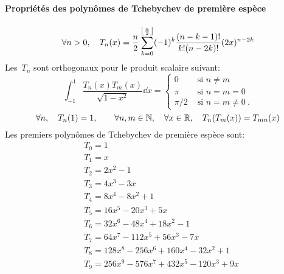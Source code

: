 \paragraph{Propriétés des polynômes de Tchebychev de première espèce} 
\begin{equation}
\forall n>0, \quad T_n(x)=\dfrac n2\displaystyle\sum_{k=0}^{\left\lfloor \frac n2\right\rfloor}(-1)^k \frac{(n-k-1)!}{k!(n-2k)!}(2x)^{n-2k} 
\end{equation}
Les~$T_n$ sont orthogonaux pour le produit scalaire suivant: 
\begin{equation}
 \int_{-1}^1 \frac{T_n(x)T_m(x)}{\sqrt{1-x^2}}\dd x= 
\begin{cases} 0&\text{ si } n\ne m\\ \pi&\text{ si } n=m=0\\ \pi/2&\text{ si } n=m\ne 0~. 
\end{cases} 
\end{equation}
\begin{equation}
\forall n, \quad T_n(1)=1,\qquad\forall n,m\in\mathbb N,\quad \forall x\in\mathbb R, \quad T_n(T_m(x))=T_{mn}(x) 
\end{equation}
Les premiers polynômes de Tchebychev de première espèce sont:
\begin{equation}
\begin{aligned}
&T_0 = 1 \\
&T_1 = x \\
&T_2 = 2x^2 - 1 \\
&T_3 = 4x^3 - 3x \\
& T_4 = 8x^4 - 8x^2 + 1 \\
& T_5 = 16x^5 - 20x^3 + 5x \\
& T_6 = 32x^6 - 48x^4 + 18x^2 - 1 \\
& T_7 = 64x^7 - 112x^5 + 56x^3 - 7x \\
& T_8 = 128x^8 - 256x^6 + 160x^4 - 32x^2 + 1 \\
&T_9 = 256x^9 - 576x^7 + 432x^5 - 120x^3 + 9x
\end{aligned}
\end{equation}
\medskipvm
